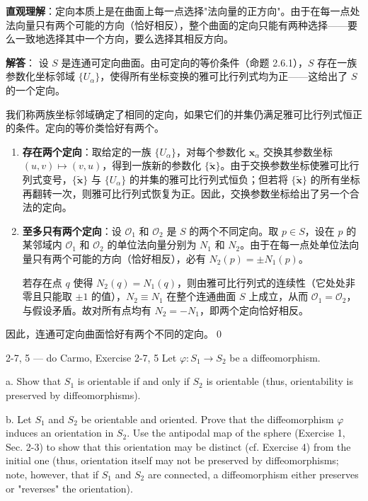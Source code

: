 \begin{solution}
\textbf{直观理解}：定向本质上是在曲面上每一点选择"法向量的正方向"。由于在每一点处法向量只有两个可能的方向（恰好相反），整个曲面的定向只能有两种选择——要么一致地选择其中一个方向，要么选择其相反方向。

\textbf{解答}：
设 $S$ 是连通可定向曲面。由可定向的等价条件（命题 2.6.1），$S$ 存在一族参数化坐标邻域 $\{U_\alpha\}$，使得所有坐标变换的雅可比行列式均为正——这给出了 $S$ 的一个定向。

我们称两族坐标邻域确定了相同的定向，如果它们的并集仍满足雅可比行列式恒正的条件。定向的等价类恰好有两个。

\begin{enumerate}
    \item \textbf{存在两个定向}：取给定的一族 $\{U_\alpha\}$，对每个参数化 $\mathbf{x}_\alpha$ 交换其参数坐标 $(u, v) \mapsto (v, u)$，得到一族新的参数化 $\{\tilde{\mathbf{x}}\}$。由于交换参数坐标使雅可比行列式变号，$\{\tilde{\mathbf{x}}\}$ 与 $\{U_\alpha\}$ 的并集的雅可比行列式恒负；但若将 $\{\tilde{\mathbf{x}}\}$ 的所有坐标再翻转一次，则雅可比行列式恢复为正。因此，交换参数坐标给出了另一个合法的定向。

    \item \textbf{至多只有两个定向}：设 $\mathcal{O}_1$ 和 $\mathcal{O}_2$ 是 $S$ 的两个不同定向。取 $p \in S$，设在 $p$ 的某邻域内 $\mathcal{O}_1$ 和 $\mathcal{O}_2$ 的单位法向量分别为 $N_1$ 和 $N_2$。由于在每一点处单位法向量只有两个可能的方向（恰好相反），必有 $N_2(p) = \pm N_1(p)$。

    若存在点 $q$ 使得 $N_2(q) = N_1(q)$，则由雅可比行列式的连续性（它处处非零且只能取 $\pm 1$ 的值），$N_2 \equiv N_1$ 在整个连通曲面 $S$ 上成立，从而 $\mathcal{O}_1 = \mathcal{O}_2$，与假设矛盾。故对所有点均有 $N_2 = -N_1$，即两个定向恰好相反。
\end{enumerate}
因此，连通可定向曲面恰好有两个不同的定向。\qed
\end{solution}

\begin{exercise}{2-7, 5 — do Carmo, Exercise 2-7, 5}
Let $\varphi: S_1 \to S_2$ be a diffeomorphism.

a. Show that $S_1$ is orientable if and only if $S_2$ is orientable (thus, orientability is preserved by diffeomorphisms).

b. Let $S_1$ and $S_2$ be orientable and oriented. Prove that the diffeomorphism $\varphi$ induces an orientation in $S_2$. Use the antipodal map of the sphere (Exercise 1, Sec. 2-3) to show that this orientation may be distinct (cf. Exercise 4) from the initial one (thus, orientation itself may not be preserved by diffeomorphisms; note, however, that if $S_1$ and $S_2$ are connected, a diffeomorphism either preserves or "reverses" the orientation).
\end{exercise}

